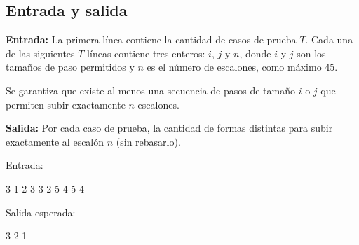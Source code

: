 \subsection{Entrada y salida}

\textbf{Entrada:} La primera línea contiene la cantidad de casos de prueba $T$. Cada una de las siguientes $T$ líneas contiene tres enteros: $i$, $j$ y $n$, donde $i$ y $j$ son los tamaños de paso permitidos y $n$ es el número de escalones, como máximo $45$. 

Se garantiza que existe al menos una secuencia de pasos de tamaño $i$ o $j$ que permiten subir exactamente $n$ escalones.

\textbf{Salida:} Por cada caso de prueba, la cantidad de formas distintas para subir exactamente al escalón $n$ (sin rebasarlo).

Entrada:
\begin{pseudocode}
3
1 2 3
3 2 5
4 5 4
\end{pseudocode}

Salida esperada:
\begin{pseudocode}
3
2
1
\end{pseudocode}
